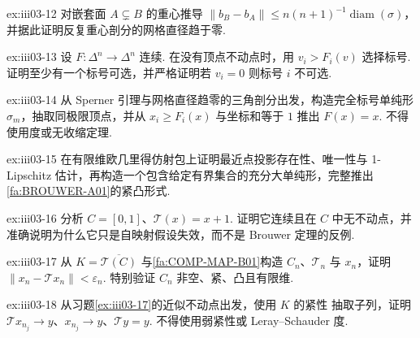 \begin{FAExercise}[重心剖分的网格直径收缩]{ex:iii03-12}
对嵌套面 \(\displaystyle A\subsetneq B\) 的重心推导 \(\displaystyle \|b_B-b_A\|\leqslant n(n+1)^{-1}\operatorname{diam}(\sigma)\)，并据此证明反复重心剖分的网格直径趋于零.
\end{FAExercise}

\begin{FAExercise}{ex:iii03-13}
设 \(\displaystyle F:\Delta^n\to\Delta^n\) 连续. 在没有顶点不动点时，用 \(\displaystyle v_i>F_i(v)\) 选择标号. 证明至少有一个标号可选，并严格证明若 \(\displaystyle v_i=0\) 则标号 \(\displaystyle i\) 不可选.
\end{FAExercise}

\begin{FAExercise}{ex:iii03-14}
从 Sperner 引理与网格直径趋零的三角剖分出发，构造完全标号单纯形 \(\displaystyle \sigma_m\)，抽取同极限顶点，并从 \(\displaystyle x_i\geqslant F_i(x)\) 与坐标和等于 \(\displaystyle1\) 推出 \(\displaystyle F(x)=x\). 不得使用度或无收缩定理.
\end{FAExercise}

\begin{FAExercise}[有限维紧凸推广]{ex:iii03-15}
在有限维欧几里得仿射包上证明最近点投影存在性、唯一性与 1-Lipschitz 估计，再构造一个包含给定有界集合的充分大单纯形，完整推出\autoref{fa:BROUWER-A01}的紧凸形式.
\end{FAExercise}

\begin{FAExercise}[不变性失效]{ex:iii03-16}
分析 \(\displaystyle C=[0,1]\)、\(\displaystyle \mathcal T(x)=x+1\). 证明它连续且在 \(\displaystyle C\) 中无不动点，并准确说明为什么它只是自映射假设失效，而不是 Brouwer 定理的反例.
\end{FAExercise}

\begin{FAExercise}{ex:iii03-17}
从 \(\displaystyle K=\overline{\mathcal T(C)}\) 与\autoref{fa:COMP-MAP-B01}构造 \(\displaystyle C_n\)、\(\displaystyle \mathcal T_n\) 与 \(\displaystyle x_n\)，证明 \(\displaystyle \|x_n-\mathcal T x_n\|<\varepsilon_n\). 特别验证 \(\displaystyle C_n\) 非空、紧、凸且有限维.
\end{FAExercise}

\begin{FAExercise}{ex:iii03-18}
从习题\ref{ex:iii03-17}的近似不动点出发，使用 \(\displaystyle K\) 的紧性 抽取子列，证明 \(\displaystyle \mathcal T x_{n_j}\to y\)、\(\displaystyle x_{n_j}\to y\)、\(\displaystyle \mathcal T y=y\). 不得使用弱紧性或 Leray--Schauder 度.
\end{FAExercise}

